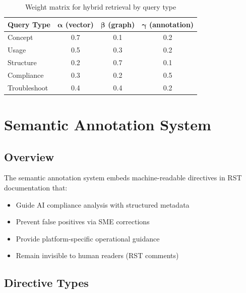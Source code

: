 \documentclass[11pt,letterpaper,twoside]{article}
\begin{document}
\begin{table}[H]
\centering
\renewcommand{\arraystretch}{1.2}
\begin{tabular}{l|ccc}
\toprule
\textbf{Query Type} & $\boldsymbol{\alpha}$ \textbf{(vector)} & $\boldsymbol{\beta}$ \textbf{(graph)} & $\boldsymbol{\gamma}$ \textbf{(annotation)} \\
\midrule
Concept & 0.7 & 0.1 & 0.2 \\
Usage & 0.5 & 0.3 & 0.2 \\
Structure & 0.2 & 0.7 & 0.1 \\
Compliance & 0.3 & 0.2 & 0.5 \\
Troubleshoot & 0.4 & 0.4 & 0.2 \\
\bottomrule
\end{tabular}
\caption{Weight matrix for hybrid retrieval by query type}
\end{table}

\newpage
\section{Semantic Annotation System}

\subsection{Overview}

The semantic annotation system embeds machine-readable directives in RST documentation that:
\begin{itemize}[leftmargin=2em, itemsep=2pt, parsep=0pt]
    \item Guide AI compliance analysis with structured metadata
    \item Prevent false positives via SME corrections
    \item Provide platform-specific operational guidance
    \item Remain invisible to human readers (RST comments)
\end{itemize}

\subsection{Directive Types}
\end{document}
